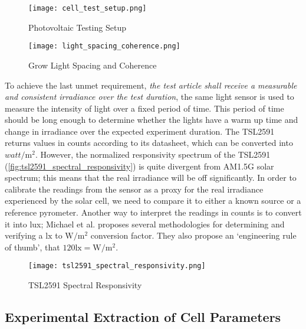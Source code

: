 \begin{figure}[!htbp]
    \texttt{[image: cell\_test\_setup.png]}
    \caption{Photovoltaic Testing Setup}
    \label{fig:cell_test_setup}
\end{figure}

\begin{figure}[h]
    \centering
    \texttt{[image: light\_spacing\_coherence.png]}
    \caption{Grow Light Spacing and Coherence}
    \label{fig:light_spacing_coherence}
\end{figure}

To achieve the last unmet requirement, \textit{the test article shall receive a
measurable and consistent irradiance over the test duration}, the same light
sensor is used to measure the intensity of light over a fixed period of time.
This period of time should be long enough to determine whether the lights have a
warm up time and change in irradiance over the expected experiment duration.
The TSL2591 returns values in counts according to its datasheet, which can be
converted into $\si{watt}/\si{\meter}^2$. However, the normalized responsivity
spectrum of the TSL2591 (\autoref{fig:tsl2591_spectral_responsivity}) is quite
divergent from AM1.5G solar spectrum; this means that the real irradiance will
be off significantly. In order to calibrate the readings from the sensor as a
proxy for the real irradiance experienced by the solar cell, we need to compare
it to either a known source or a reference pyrometer. Another way to interpret
the readings in counts is to convert it into lux; Michael et
al.\cite{michael_et_al} proposes several methodologies for determining and
verifying a $\si{\lux}$ to $\si{\watt}/\si{\meter}^2$ conversion factor. They
also propose an `engineering rule of thumb', that $120 \si{\lux} =
\si{\watt}/\si{\meter}^2$.

\begin{figure}[!htbp]
    \centering
    \texttt{[image: tsl2591\_spectral\_responsivity.png]}
    \caption{TSL2591 Spectral Responsivity}
    \label{fig:tsl2591_spectral_responsivity}
\end{figure}


\subsection{Experimental Extraction of Cell Parameters}\label{subsec:experimental_extraction_of_cell_parameters}

